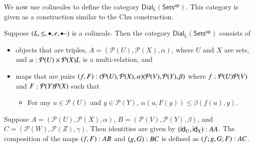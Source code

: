\documentclass{llncs}
\let\to\relax
\newcommand{\to}{\rightarrow}
\newcommand{\powerset}[1]{\mathcal{P}(#1)}
\newcommand{\colimp}[0]{\multimapdotinv}
\newcommand{\dial}[1]{\mathsf{Dial_{#1}}(\mathsf{Sets^{op}})}
\newcommand{\id}[0]{\mathsf{id}}
\begin{document}
We now use colineales to define the category $\dial{L}$.  This
category is given as a construction similar to the Chu construction.
\begin{definition}
  \label{def:dialect-category}
  Suppose $(L, \leq, \bullet, e, \colimp)$ is a colineale.  Then the category $\dial{L}$ consists of 
  \begin{itemize}
  \item objects that are triples, $A = (\powerset{U},\powerset{X},\alpha)$, where $U$ and
    $X$ are sets, and $\alpha : \powerset{U} \times \powerset{X} \to L$ is a multi-relation, and
  \item maps that are pairs $(f,F) : (\powerset{U},\powerset{X},\alpha) \to (\powerset{V},\powerset{Y},\beta)$
    where $f : \powerset{U} \to \powerset{V}$ and $F : \powerset{Y} \to \powerset{X}$ such that
    \begin{itemize}
    \item For any $u \in \powerset{U}$ and $y \in \powerset{Y}$, $\alpha(u,F(y)) \leq \beta(f(u),y)$.
    \end{itemize}
  \end{itemize}
  Suppose $A = (\powerset{U},\powerset{X},\alpha)$, $B = (\powerset{V},\powerset{Y},\beta)$, and $C =
  (\powerset{W},\powerset{Z},\gamma)$.  Then identities are given by $(\id_U,\id_X) : A \to
  A$.  The composition of the maps $(f,F) : A \to B$ and $(g, G) : B
  \to C$ is defined as $(f;g,G;F) : A \to C$.
\end{definition}



 
\end{document}
